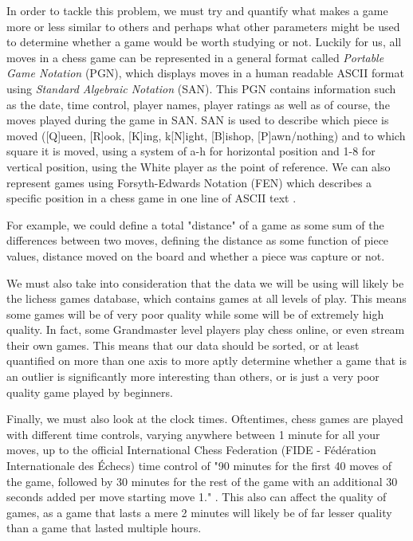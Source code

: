 \documentclass[12pt]{article}
\begin{document}
    In order to tackle this problem, we must try and quantify what makes a game more or less similar to others and perhaps what other parameters might be used to determine whether a game would be worth studying or not. Luckily for us, all moves in a chess game can be represented in a general format called \textit{Portable Game Notation} (PGN), which displays moves in a human readable ASCII format using \textit{Standard Algebraic Notation} (SAN). This PGN contains information such as the date, time control, player names, player ratings as well as of course, the moves played during the game in SAN. SAN is used to describe which piece is moved ([Q]ueen, [R]ook, [K]ing, k[N]ight, [B]ishop, [P]awn/nothing) and to which square it is moved, using a system of a-h for horizontal position and 1-8 for vertical position, using the White player as the point of reference. We can also represent games using Forsyth-Edwards Notation (FEN) which describes a specific position in a chess game in one line of ASCII text \cite{pgnrules}.

    For example, we could define a total "distance" of a game as some sum of the differences between two moves, defining the distance as some function of piece values, distance moved on the board and whether a piece was capture or not.

    We must also take into consideration that the data we will be using will likely be the lichess games database, which contains games at all levels of play. This means some games will be of very poor quality while some will be of extremely high quality. In fact, some Grandmaster level players play chess online, or even stream their own games. This means that our data should be sorted, or at least quantified on more than one axis to more aptly determine whether a game that is an outlier is significantly more interesting than others, or is just a very poor quality game played by beginners.

    Finally, we must also look at the clock times. Oftentimes, chess games are played with different time controls, varying anywhere between 1 minute for all your moves, up to the official International Chess Federation (FIDE - Fédération Internationale des Échecs) time control of "90 minutes for the first 40 moves of the game, followed by 30 minutes for the rest of the game with an additional 30 seconds added per move starting move 1." \cite{fiderules}. This also can affect the quality of games, as a game that lasts a mere 2 minutes will likely be of far lesser quality than a game that lasted multiple hours. 
\end{document}

